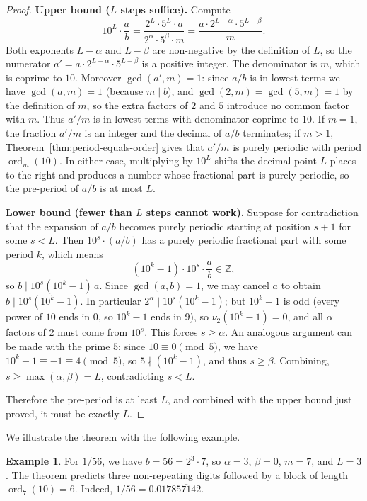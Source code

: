 \documentclass[12pt]{amsart}
\theoremstyle{definition}
\newtheorem{example}[theorem]{Example}
\theoremstyle{remark}
\newcommand{\Z}{\mathbb{Z}}
\newcommand{\ord}{\operatorname{ord}}
\begin{document}
\begin{proof}
\textbf{Upper bound ($L$ steps suffice).} Compute
\[
  10^L \cdot \frac{a}{b} 
  = \frac{2^L \cdot 5^L \cdot a}{2^\alpha \cdot 5^\beta \cdot m}
  = \frac{a \cdot 2^{L - \alpha} \cdot 5^{L - \beta}}{m}.
\]
Both exponents $L - \alpha$ and $L - \beta$ are non-negative by the 
definition of $L$, so the numerator $a' = a \cdot 2^{L-\alpha} \cdot 
5^{L-\beta}$ is a positive integer. The denominator is $m$, which is 
coprime to $10$. Moreover $\gcd(a', m) = 1$: since $a/b$ is in lowest 
terms we have $\gcd(a, m) = 1$ (because $m \mid b$), and 
$\gcd(2, m) = \gcd(5, m) = 1$ by the definition of $m$, so the extra 
factors of $2$ and $5$ introduce no common factor with $m$. Thus 
$a'/m$ is in lowest terms with denominator coprime to $10$. If $m = 1$, 
the fraction $a'/m$ is an integer and the decimal of $a/b$ terminates; 
if $m > 1$, Theorem~\ref{thm:period-equals-order} gives that $a'/m$ is 
purely periodic with period $\ord_m(10)$. In either case, multiplying 
by $10^L$ shifts the decimal point $L$ places to the right and produces 
a number whose fractional part is purely periodic, so the pre-period of 
$a/b$ is at most $L$.

\smallskip

\textbf{Lower bound (fewer than $L$ steps cannot work).} Suppose for 
contradiction that the expansion of $a/b$ becomes purely periodic 
starting at position $s + 1$ for some $s < L$. Then $10^s \cdot (a/b)$ 
has a purely periodic fractional part with some period $k$, which means
\[
  (10^k - 1) \cdot 10^s \cdot \frac{a}{b} \in \Z,
\]
so $b \mid 10^s (10^k - 1)\, a$. Since $\gcd(a, b) = 1$, we may cancel 
$a$ to obtain $b \mid 10^s(10^k - 1)$. In particular $2^\alpha \mid 
10^s(10^k - 1)$; but $10^k - 1$ is odd (every power of $10$ ends in $0$, 
so $10^k - 1$ ends in $9$), so $\nu_2(10^k - 1) = 0$, and all 
$\alpha$ factors of $2$ must come from $10^s$. This forces $s \ge 
\alpha$. An analogous argument can be made with the prime $5$: since $10 \equiv 0 
\pmod{5}$, we have $10^k - 1 \equiv -1 \equiv 4 \pmod{5}$, so 
$5 \nmid (10^k - 1)$, and thus $s \ge \beta$. Combining, 
$s \ge \max(\alpha, \beta) = L$, contradicting $s < L$. 

Therefore the pre-period is at least $L$, and combined with the upper 
bound just proved, it must be exactly $L$.
\end{proof}

We illustrate the theorem with the following example.

\begin{example}\label{ex:1-over-56}
For $1/56$, we have $b = 56 = 2^3 \cdot 7$, so $\alpha = 3$, $\beta = 0$, 
$m = 7$, and $L = 3$. The theorem predicts three non-repeating digits 
followed by a block of length $\ord_7(10) = 6$. Indeed, 
$1/56 = 0.017\overline{857142}$.
\end{example}
\end{document}
